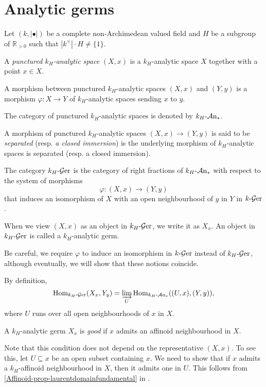 \section{Analytic germs}
Let $(k,|\bullet|)$ be a complete non-Archimedean valued field and $H$ be a subgroup of $\mathbb{R}_{>0}$ such that $|k^{\times}|\cdot H\neq \{1\}$.


\begin{definition}
    A \emph{punctured $k_H$-analytic space} $(X,x)$ is a $k_H$-analytic space $X$ together with a point $x\in X$.

    A morphism between punctured $k_H$-analytic spaces $(X,x)$ and $(Y,y)$ is a morphism $\varphi:X\rightarrow Y$ of $k_H$-analytic spaces sending $x$ to $y$.

    The category of punctured $k_H$-analytic spaces is denoted by $k_H\text{-}\mathcal{A}\mathrm{n}_*$.
\end{definition}

\begin{definition}
    A morphism of punctured $k_H$-analytic spaces $(X,x)\rightarrow (Y,y)$ is said to be \emph{separated} (resp. \emph{a closed immersion}) is the underlying morphism of  $k_H$-analytic spaces is separated (resp. a closed immersion).
\end{definition}

\begin{definition}
    The category $k_H\text{-}\mathcal{G}\mathrm{er}$ is the category of right fractions of $k_H\text{-}\mathcal{A}\mathrm{n}_*$ with respect to the system of morphisms
    \[
        \varphi:(X,x)\rightarrow (Y,y)  
    \]
    that induces an isomorphism of $X$ with an open neighbourhood of $y$ in $Y$ in $k\text{-}\mathcal{G}\mathrm{er}$.

    When we view $(X,x)$ as an object in $k_H\text{-}\mathcal{G}\mathrm{er}$, we write it as $X_x$. An object in $k_H\text{-}\mathcal{G}\mathrm{er}$ is called a $k_H$-analytic germ.
\end{definition}
Be careful, we require $\varphi$ to induce an isomorphism in $k\text{-}\mathcal{G}\mathrm{er}$ instead of $k_H\text{-}\mathcal{G}\mathrm{er}$, although eventually, we will show that these notions coincide.

By definition,
\[
    \operatorname{Hom}_{k_H\text{-}\mathcal{G}\mathrm{er}}(X_x,Y_y)=\varinjlim_{U}\operatorname{Hom}_{k_H\text{-}\mathcal{A}\mathrm{n}_*}((U,x),(Y,y)),  
\]
where $U$ runs over all open neighbourhoods of $x$ in $X$. 

\begin{definition}
    A $k_H$-analytic germ $X_x$ is \emph{good} if $x$ admits an affinoid neighbourhood in $X$.
\end{definition}
Note that this condition does not depend on the representative $(X,x)$. To see this, let $U\subseteq x$ be an open subset containing $x$. We need to show that if $x$ admits a $k_H$-affinoid neighbourhood in $X$, then it admits one in $U$. This follows from \cref{Affinoid-prop-laurentdomainfundamental} in .

